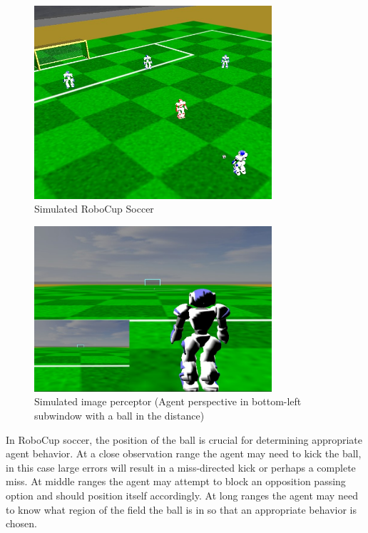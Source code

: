 \documentclass[a4paper,twoside,12pt]{report}
\begin{document}
\begin{figure}[h!]
\begin{center}
\includegraphics[width=8.8cm]{images/Robocup1.jpg}
\caption{Simulated RoboCup Soccer}
\label{fig:robofb}
\end{center}
\end{figure}

\begin{figure}[h!]
\begin{center}
\includegraphics[width=8.8cm]{images/Robocup2.jpg}
\caption{Simulated image perceptor (Agent perspective in bottom-left subwindow with a ball in the distance)}
\label{fig:agentview}
\end{center}
\end{figure}

In RoboCup soccer, the position of the ball is crucial for determining appropriate agent behavior. At a close observation range the agent may need to kick the ball, in this case large errors will result in a miss-directed kick or perhaps a complete miss. At middle ranges the agent may attempt to block an opposition passing option and should position itself accordingly. At long ranges the agent may need to know what region of the field the ball is in so that an appropriate behavior is chosen. 
\end{document}
